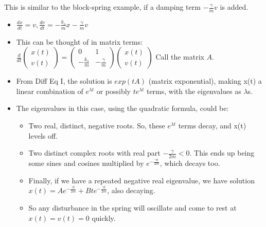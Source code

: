 \documentclass[11pt, oneside]{article}   	%
\begin{document}
This is similar to the block-spring example, if a damping term $-\frac{\gamma}{m}v$ is added.
\begin{itemize}
\item $\frac{dx}{dt} = v, \frac{dv}{dt} = -\frac{k_s}{m}x -\frac{\gamma}{m}v$
\item This can be thought of in matrix terms: $\frac{d}{dt} \begin{pmatrix} x(t) \\ v(t) \end{pmatrix} =  \begin{pmatrix} 0 & 1 \\ -\frac{k_s}{m} & -\frac{\gamma}{m} \end{pmatrix}  \begin{pmatrix}x(t) \\ v(t)\end{pmatrix}$ Call the matrix $A$.
\item From Diff Eq I, the solution is $exp(tA)$ (matrix exponential), making x(t) a linear combination of $e^{\lambda t}$ or possibly $te^{\lambda t}$ terms, with the eigenvalues as $\lambda$s.
\item The eigenvalues in this case, using the quadratic formula, could be:
\begin{itemize}
\item Two real, distinct, negative roots. So, these $e^{\lambda t}$ terms decay, and x(t) levels off.
\item Two distinct complex roots with real part $-\frac{\gamma}{2m} < 0$.  This ends up being some sines and cosines multiplied by $e^{-\frac{\gamma t}{2m}}$, which decays too.
\item Finally, if we have a repeated negative real eigenvalue, we have solution $x(t) = Ae^{-\frac{\gamma t}{2m}} + Bte^{-\frac{\gamma t}{2m}} $, also decaying.
\item So any disturbance in the spring will oscillate and come to rest at $x(t) = v(t) = 0$ quickly.
\end{itemize}


\end{itemize}
\end{document}
